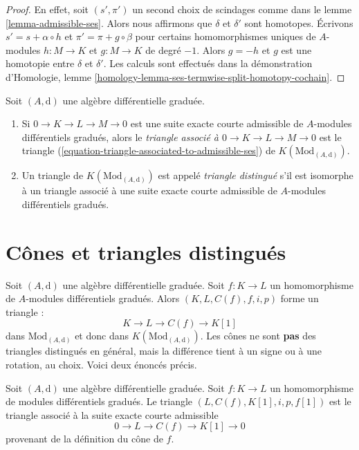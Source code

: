 \begin{proof}
En effet, soit $(s', \pi')$ un second choix de scindages comme
dans le lemme \ref{lemma-admissible-ses}. Alors nous affirmons que $\delta$ et
$\delta'$ sont homotopes. Écrivons $s' = s + \alpha \circ h$ et
$\pi' = \pi + g \circ \beta$ pour certains homomorphismes uniques
de $A$-modules $h : M \to K$ et $g : M \to K$ de degré $-1$. Alors
$g = -h$ et $g$ est une homotopie entre $\delta$ et $\delta'$. Les
calculs sont effectués dans la démonstration
d'Homologie, lemme \ref{homology-lemma-ses-termwise-split-homotopy-cochain}.
\end{proof}

\begin{definition}
\label{definition-distinguished-triangle}
Soit $(A, \text{d})$ une algèbre différentielle graduée.
\begin{enumerate}
\item Si $0 \to K \to L \to M \to 0$ est une suite exacte courte
admissible de $A$-modules différentiels gradués, alors le {\it triangle associé
à $0 \to K \to L \to M \to 0$} est le triangle
(\ref{equation-triangle-associated-to-admissible-ses}) de
$K(\text{Mod}_{(A, \text{d})})$.
\item Un triangle de $K(\text{Mod}_{(A, \text{d})})$ est
appelé {\it triangle distingué} s'il est isomorphe à un triangle
associé à une suite exacte courte admissible de
$A$-modules différentiels gradués.
\end{enumerate}
\end{definition}









\section{Cônes et triangles distingués}
\label{section-cones-and-triangles}

\noindent
Soit $(A, \text{d})$ une algèbre différentielle graduée.
Soit $f : K \to L$ un homomorphisme de $A$-modules différentiels gradués.
Alors $(K, L, C(f), f, i, p)$ forme un triangle :
$$
K \to L \to C(f) \to K[1]
$$
dans $\text{Mod}_{(A, \text{d})}$ et donc dans $K(\text{Mod}_{(A, \text{d})})$.
Les cônes ne sont {\bf pas} des triangles distingués en général, mais la
différence tient à un signe ou à une rotation, au choix. Voici deux énoncés précis.

\begin{lemma}
\label{lemma-rotate-cone}
Soit $(A, \text{d})$ une algèbre différentielle
graduée. Soit $f : K \to L$ un homomorphisme de modules différentiels
gradués. Le triangle $(L, C(f), K[1], i, p,
f[1])$ est le triangle associé à la suite exacte courte admissible
$$
0 \to L \to C(f) \to K[1] \to 0
$$
provenant de la définition du cône de $f$.
\end{lemma}

